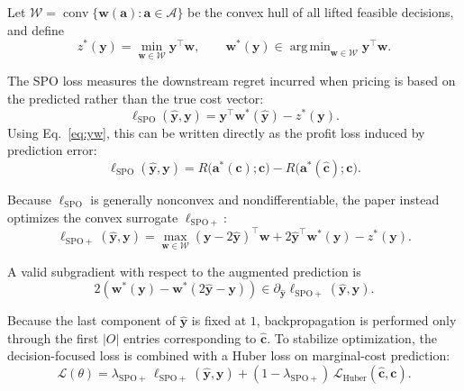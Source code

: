\documentclass[preprint,12pt,authoryear]{elsarticle}
\DeclareMathOperator*{\argmin}{arg\,min}
\begin{document}
Let $\mathcal{W}=\operatorname{conv}\{\mathbf{w}(\mathbf{a}): \mathbf{a}\in\mathcal{A}\}$ be the convex hull of all lifted feasible decisions, and define
\begin{equation}
z^{*}(\mathbf{y}) = \min_{\mathbf{w}\in\mathcal{W}} \mathbf{y}^{\top}\mathbf{w},
\qquad
\mathbf{w}^{*}(\mathbf{y}) \in \argmin_{\mathbf{w}\in\mathcal{W}} \mathbf{y}^{\top}\mathbf{w}.
\tag{28}\label{eq:zstar}
\end{equation}

The SPO loss measures the downstream regret incurred when pricing is based on the predicted rather than the true cost vector:
\begin{equation}
\ell_{\mathrm{SPO}}(\hat{\mathbf{y}},\mathbf{y})
= \mathbf{y}^{\top}\mathbf{w}^{*}(\hat{\mathbf{y}})
- z^{*}(\mathbf{y}).
\tag{29}\label{eq:spo-loss}
\end{equation}
Using Eq.~\eqref{eq:yw}, this can be written directly as the profit loss induced by prediction error:
\begin{equation}
\ell_{\mathrm{SPO}}(\hat{\mathbf{y}},\mathbf{y})
= R\big(\mathbf{a}^{*}(\mathbf{c});\mathbf{c}\big)
- R\big(\mathbf{a}^{*}(\hat{\mathbf{c}});\mathbf{c}\big).
\tag{30}\label{eq:spo-regret}
\end{equation}

Because $\ell_{\mathrm{SPO}}$ is generally nonconvex and nondifferentiable, the paper instead optimizes the convex surrogate $\ell_{\mathrm{SPO}+}$:
\begin{equation}
\ell_{\mathrm{SPO}+}(\hat{\mathbf{y}},\mathbf{y})
= \max_{\mathbf{w}\in\mathcal{W}} (\mathbf{y}-2\hat{\mathbf{y}})^{\top}\mathbf{w}
+ 2\hat{\mathbf{y}}^{\top}\mathbf{w}^{*}(\mathbf{y})
- z^{*}(\mathbf{y}).
\tag{31}\label{eq:spoplus}
\end{equation}

A valid subgradient with respect to the augmented prediction is
\begin{equation}
2\left(\mathbf{w}^{*}(\mathbf{y}) - \mathbf{w}^{*}(2\hat{\mathbf{y}}-\mathbf{y})\right)
\in \partial_{\hat{\mathbf{y}}}\ell_{\mathrm{SPO}+}(\hat{\mathbf{y}},\mathbf{y}).
\tag{32}\label{eq:spograd}
\end{equation}

Because the last component of $\hat{\mathbf{y}}$ is fixed at $1$, backpropagation is performed only through the first $|O|$ entries corresponding to $\hat{\mathbf{c}}$. To stabilize optimization, the decision-focused loss is combined with a Huber loss on marginal-cost prediction:
\begin{equation}
\mathcal{L}(\theta)
= \lambda_{\mathrm{SPO}+}\,\ell_{\mathrm{SPO}+}(\hat{\mathbf{y}},\mathbf{y})
+ (1-\lambda_{\mathrm{SPO}+})\,\mathcal{L}_{\mathrm{Huber}}(\hat{\mathbf{c}},\mathbf{c}).
\tag{33}\label{eq:blend-loss}
\end{equation}
\end{document}
